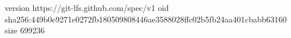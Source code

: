 version https://git-lfs.github.com/spec/v1
oid sha256:449b0e9271e0272fb180509808446ae3588028ffc02b5fb24aa401cbabb63160
size 699236
